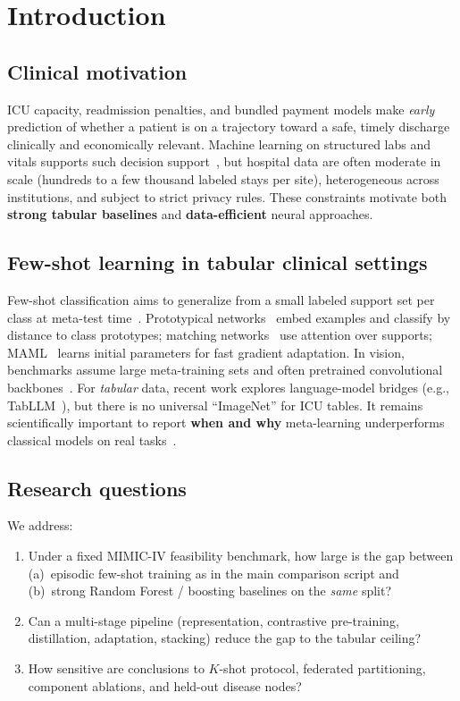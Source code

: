 \section{Introduction}
\label{sec:intro}

\subsection{Clinical motivation}
ICU capacity, readmission penalties, and bundled payment models make \emph{early} prediction of whether a patient is on a trajectory toward a safe, timely discharge clinically and economically relevant. Machine learning on structured labs and vitals supports such decision support~\citep{awad2017random,purushotham2018benchmarking,ghassemi2021practical}, but hospital data are often moderate in scale (hundreds to a few thousand labeled stays per site), heterogeneous across institutions, and subject to strict privacy rules. These constraints motivate both \textbf{strong tabular baselines} and \textbf{data-efficient} neural approaches.

\subsection{Few-shot learning in tabular clinical settings}
Few-shot classification aims to generalize from a small labeled support set per class at meta-test time~\citep{wang2020generalizing}. Prototypical networks~\citep{snell2017prototypical} embed examples and classify by distance to class prototypes; matching networks~\citep{vinyals2016matching} use attention over supports; MAML~\citep{finn2017model} learns initial parameters for fast gradient adaptation. In vision, benchmarks assume large meta-training sets and often pretrained convolutional backbones~\citep{chen2019closer,triantafillou2020meta}. For \emph{tabular} data, recent work explores language-model bridges (e.g., TabLLM~\citep{hegselmann2023tabllm}), but there is no universal ``ImageNet'' for ICU tables. It remains scientifically important to report \textbf{when and why} meta-learning underperforms classical models on real tasks~\citep{makel2012replications}.

\subsection{Research questions}
We address:
\begin{enumerate}[label=(\textbf{Q\arabic*})]
  \item Under a fixed MIMIC-IV feasibility benchmark, how large is the gap between (a)~episodic few-shot training as in the main comparison script and (b)~strong Random Forest / boosting baselines on the \emph{same} split?
  \item Can a multi-stage pipeline (representation, contrastive pre-training, distillation, adaptation, stacking) reduce the gap to the tabular ceiling?
  \item How sensitive are conclusions to $K$-shot protocol, federated partitioning, component ablations, and held-out disease nodes?
\end{enumerate}

